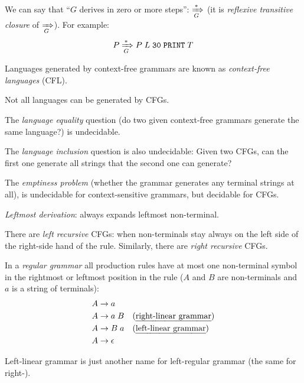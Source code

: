 \documentclass{article}
\begin{document}
We can say that ``$G$ derives in zero or more steps'': $\xRightarrow[G]{*}$ (it is \emph{reflexive transitive closure} of $\xRightarrow[G]{}$). For example:
\begin{equation*}
\begin{split}
P &\xRightarrow[G]{*} P \; L \; \texttt{30} \; \texttt{PRINT} \; T \\
\end{split}
\end{equation*}
\plush{}

Languages generated by context-free grammars are known as \emph{context-free languages} (CFL).

Not all languages can be generated by CFGs.
\plush{}

The \emph{language equality} question (do two given context-free grammars generate the same language?) is undecidable.

The \emph{language inclusion} question is also undecidable: Given two CFGs, can the first one generate all strings that the second one can generate?
\plush{}

The \emph{emptiness problem} (whether the grammar generates any terminal strings at all), is undecidable for context-sensitive grammars, but decidable for CFGs.
\plush{}

\emph{Leftmost derivation}: always expands leftmost non-terminal.

There are \emph{left recursive} CFGs: when non-terminals stay always on the left side of the right-side hand of the rule. Similarly, there are \emph{right recursive} CFGs.
\plush{}


In a \emph{regular grammar} all production rules have at most one non-terminal symbol in the rightmost or leftmost position in the rule
($A$ and $B$ are non-terminals and $a$ is a string of terminals):
\begin{equation*}
\begin{split}
A &\to a \\
A &\to a \; B \quad \text{(\emph{right-linear grammar})} \\
A &\to B \; a \quad \text{(\emph{left-linear grammar})} \\
A &\to \epsilon \\
\end{split}
\end{equation*}
\plush{}

Left-linear grammar is just another name for left-regular grammar (the same for right-).
\plush{}
\end{document}
